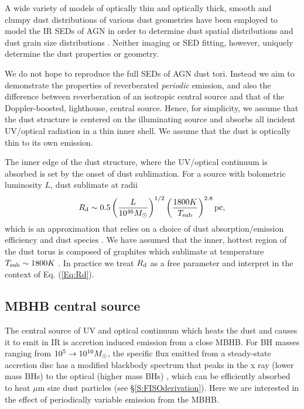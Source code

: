 A wide variety of models of optically thin and optically thick, smooth
and clumpy dust distributions of various dust geometries have been employed to model the IR SEDs of AGN in order to determine dust
spatial distributions and dust grain size distributions \citep[see the review by][as well as  \cite{Barvainis:1987,PierKrolikI:1992b, PierKrolikII:1993, LaorDraine:1993, GranatoDanese:1994,  Granato:1997,RowanRobinson:1995,Manske:1998,Nenkova:2002,vanBemmelDullemond:2003, Schartmann:2005, NenkovaI:2008,NenkovaII:2008, HonigII:2010, MorTrakhtenbrot:2011,MorNetzer:2012}]{Netzer:2015:rev}. Neither imaging or SED fitting, however, uniquely determine the dust properties or geometry.


We do not hope to reproduce the full SEDs of AGN dust tori. Instead we aim to
demonstrate the properties of reverberated \textit{periodic} emission, and also
the difference between reverberation of an isotropic central source and that
of the Doppler-boosted, lighthouse, central source. Hence, for simplicity, we
assume that the dust structure is centered on the illuminating source and
absorbs all incident UV/optical radiation in a thin inner
shell. We assume that the dust is optically thin to its own
emission.



The inner edge of the dust structure, where the UV/optical continuum is
absorbed is set by the onset of dust sublimation.  For a source with
bolometric luminosity $L$, dust sublimate at radii
\begin{equation}
R_{\rm{d}} \sim 0.5 \left(\frac{L}{10^{46} {M_{\odot}} }\right)^{1/2}  
\left(\frac{1800 K}{ T_{\rm{sub}} }\right)^{2.8} \rm{pc},
\label{Eq:Rd}
\end{equation}
which is an approximation that relies on a choice of dust absorption/emission
efficiency and dust species \citep[\textit{e.g.}][]{Barvainis:1987}. We have
assumed that the inner, hottest region of the dust torus is composed of
graphites which sublimate at temperature $T_{\rm{sub}} \sim 1800 K$
\citep{MorTrakhtenbrot:2011, MorNetzer:2012}. In practice we treat $R_{\rm{d}}$ as a
free parameter and interpret in the context of Eq. (\ref{Eq:Rd}).



\subsection{MBHB central source} 

The central source of UV and optical continuum which heats the dust and causes
it to emit in IR is accretion induced emission from a close MBHB. For BH
masses ranging from $10^5 \rightarrow 10^{10} {M_{\odot}}$, the specific flux
emitted from a steady-state accretion disc has a modified blackbody spectrum
that peaks in the x ray (lower mass BHs) to the optical (higher mass BHs)
\citep{SS73, TanakaMenou:2010}, which can be efficiently absorbed to heat
$\mu$m size dust particles (see \S \ref{S:FISOderivation}). Here we are
interested in the effect of periodically variable emission from the MBHB.


